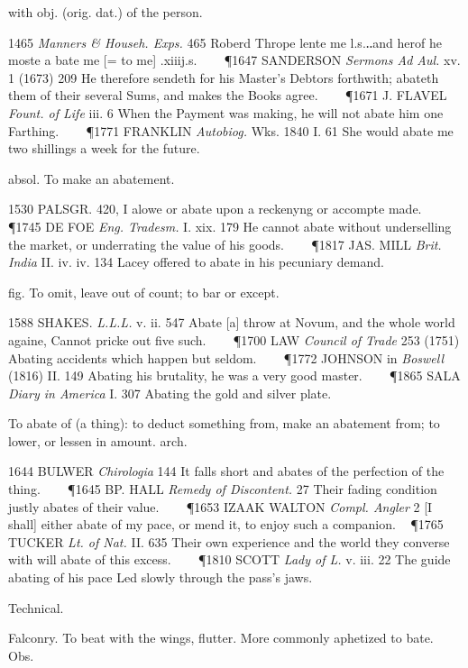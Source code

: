 \begin{description}[wide, labelwidth=!, labelindent=0pt]
\begin{myenumerate}
 with obj. (orig. dat.) of the person. 

1465 \textit{Manners \& Househ. Exps.} 465 Roberd Thrope lente me l.s.‥and herof 
he moste a bate me [= to me] .xiiij.s.    
\P 1647 SANDERSON \textit{Sermons Ad Aul.} xv. 1 (1673) 209 He therefore 
sendeth for his Master's Debtors forthwith; abateth them of their several Sums, 
and makes the Books agree.    
\P 1671 J. FLAVEL \textit{Fount. of Life} iii. 6 When the Payment was making, 
he will not abate him one Farthing.    
\P 1771 FRANKLIN \textit{Autobiog.} Wks. 1840 I. 61 She would abate me two 
shillings a week for the future.

 absol. To make an abatement. 

1530 PALSGR. 420, I alowe or abate upon a reckenyng or accompte made.    
\P 1745 DE FOE \textit{Eng. Tradesm.} I. xix. 179 He cannot abate without 
underselling the market, or underrating the value of his goods.    
\P 1817 JAS. MILL \textit{Brit. India} II. iv. iv. 134 Lacey offered to 
abate in his pecuniary demand.

 fig. To omit, leave out of count; to bar or except. 

1588 SHAKES. \textit{L.L.L.} v. ii. 547 Abate [a] throw at Novum, and the 
whole world againe, Cannot pricke out five such.    
\P 1700 LAW \textit{Council of Trade} 253 (1751) Abating accidents which 
happen but seldom.    
\P 1772 JOHNSON in \textit{Boswell} (1816) II. 149 Abating his brutality, 
he was a very good master.    
\P 1865 SALA \textit{Diary in America} I. 307 Abating the gold and silver plate.

 To abate of (a thing): to deduct something from, make an abatement 
from; to lower, or lessen in amount. arch. 

1644 BULWER \textit{Chirologia} 144 It falls short and abates of the perfection 
of the thing.    
\P 1645 BP. HALL \textit{Remedy of Discontent.} 27 Their fading condition 
justly abates of their value.    
\P 1653 IZAAK WALTON \textit{Compl. Angler} 2 [I shall] either abate of my 
pace, or mend it, to enjoy such a companion.  
\P 1765 TUCKER \textit{Lt. of Nat.} II. 635 Their own experience and the 
world they converse with will abate of this excess.    
\P 1810 SCOTT \textit{Lady of L.} v. iii. 22 The guide abating of his 
pace Led slowly through the pass's jaws.

 Technical. 

 Falconry. To beat with the wings, flutter. More commonly 
aphetized to bate. Obs. 


\end{myenumerate}
\end{description}
